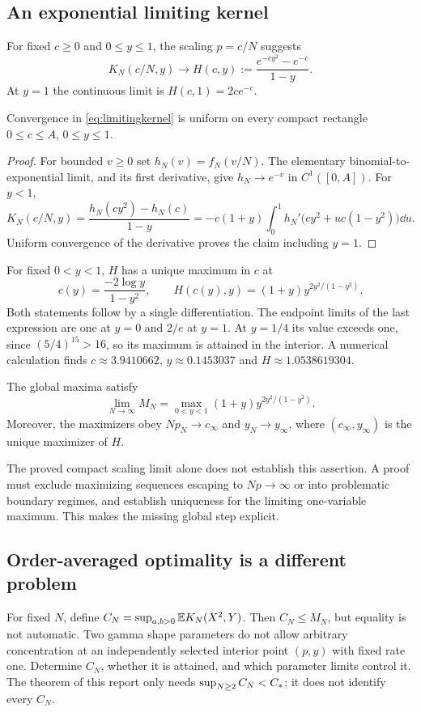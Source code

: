 \subsection{An exponential limiting kernel}
For fixed $c\ge0$ and $0\le y\le1$, the scaling $p=c/N$ suggests
\begin{equation}\label{eq:limitingkernel}
 K_N(c/N,y)\longrightarrow
 H(c,y):=\frac{e^{-cy^2}-e^{-c}}{1-y}.
\end{equation}
At $y=1$ the continuous limit is $H(c,1)=2ce^{-c}$.
\begin{proposition}\label{prop:scaling}
Convergence in \eqref{eq:limitingkernel} is uniform on every compact rectangle $0\le c\le A$, $0\le y\le1$.
\end{proposition}
\begin{proof}
For bounded $v\ge0$ set $h_N(v)=f_N(v/N)$. The elementary binomial-to-exponential limit, and its first derivative, give $h_N\to e^{-v}$ in $C^1([0,A])$. For $y<1$,
\[
 K_N(c/N,y)=\frac{h_N(cy^2)-h_N(c)}{1-y}
 =-c(1+y)\int_0^1 h_N'\bigl(cy^2+u c(1-y^2)\bigr)\dd u.
\]
Uniform convergence of the derivative proves the claim including $y=1$.
\end{proof}
For fixed $0<y<1$, $H$ has a unique maximum in $c$ at
\[
 c(y)=\frac{-2\log y}{1-y^2},\qquad
 H(c(y),y)=(1+y)y^{2y^2/(1-y^2)}.
\]
Both statements follow by a single differentiation. The endpoint limits of the last expression are one at $y=0$ and $2/e$ at $y=1$. At $y=1/4$ its value exceeds one, since $(5/4)^{15}>16$, so its maximum is attained in the interior. A numerical calculation finds $c\approx3.9410662$, $y\approx0.1453037$ and $H\approx1.0538619304$.

\begin{conjecture}\label{conj:limit}
The global maxima satisfy
\[
 \lim_{N\to\infty}M_N
 =\max_{0<y<1}(1+y)y^{2y^2/(1-y^2)}.
\]
Moreover, the maximizers obey $Np_N\to c_\infty$ and $y_N\to y_\infty$, where $(c_\infty,y_\infty)$ is the unique maximizer of $H$.
\end{conjecture}
The proved compact scaling limit alone does not establish this assertion. A proof must exclude maximizing sequences escaping to $Np\to\infty$ or into problematic boundary regimes, and establish uniqueness for the limiting one-variable maximum. This makes the missing global step explicit.

\subsection{Order-averaged optimality is a different problem}
For fixed $N$, define $C_N=\sup_{a,b>0}\mathbb E K_N(X^2,Y)$. Then $C_N\le M_N$, but equality is not automatic. Two gamma shape parameters do not allow arbitrary concentration at an independently selected interior point $(p,y)$ with fixed rate one. Determine $C_N$, whether it is attained, and which parameter limits control it. The theorem of this report only needs $\sup_{N\ge2}C_N<C_*$; it does not identify every $C_N$.

